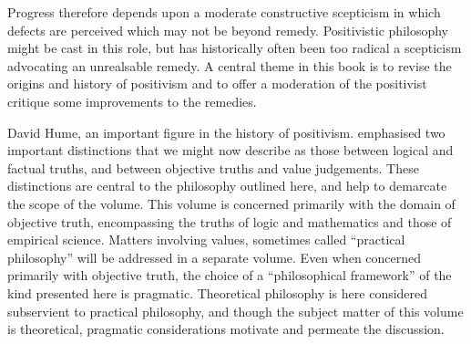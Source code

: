 Progress therefore depends upon a moderate constructive scepticism in which defects are perceived which may not be beyond remedy.
Positivistic philosophy might be cast in this role, but has historically often been too radical a scepticism advocating an unrealsable remedy.
A central theme in this book is to revise the origins and history of positivism and to offer a moderation of the positivist critique some improvements to the remedies.

David Hume, an important figure in the history of positivism. emphasised two important distinctions that we might now describe as those between logical and factual truths, and between objective truths and value judgements.
These distinctions are central to the philosophy outlined here, and help to demarcate the scope of the volume.
This volume is concerned primarily with the domain of objective truth, encompassing the truths of logic and mathematics and those of empirical science.
Matters involving values, sometimes called ``practical philosophy'' will be addressed in a separate volume.
Even when concerned primarily with objective truth, the choice of a ``philosophical framework'' of the kind presented here is pragmatic.
Theoretical philosophy is here considered subservient to practical philosophy, and though the subject matter of this volume is theoretical, pragmatic considerations motivate and permeate the discussion.

\mainmatter
